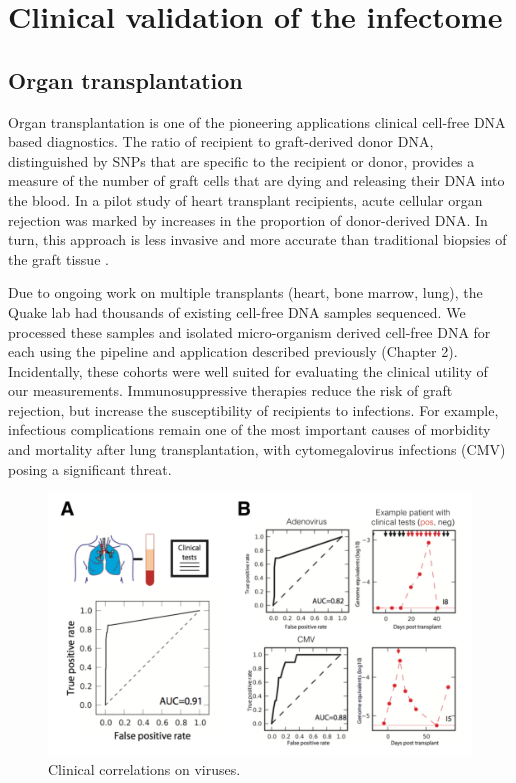 \chapter{Clinical validation of the infectome}
 
\section{Organ transplantation}
 
Organ transplantation is one of the pioneering applications clinical cell-free DNA based diagnostics. The ratio of recipient to graft-derived donor DNA, distinguished by SNPs that are specific to the recipient or donor, provides a measure of the number of graft cells that are dying and releasing their DNA into the blood. In a pilot study of heart transplant recipients, acute cellular organ rejection was marked by increases in the proportion of donor-derived DNA. In turn, this approach is less invasive and more accurate than traditional biopsies of the graft tissue \cite{Snyder:2011gd}.

Due to ongoing work on multiple transplants (heart, bone marrow, lung), the Quake lab had thousands of existing cell-free DNA samples sequenced. We processed these samples and isolated micro-organism derived cell-free DNA for each using the pipeline and application described previously (Chapter 2). Incidentally, these cohorts were well suited for evaluating the clinical utility of our measurements. Immunosuppressive therapies reduce the risk of graft rejection, but increase the susceptibility of recipients to infections. For example, infectious complications remain one of the most important causes of morbidity and mortality after lung transplantation, with cytomegalovirus infections (CMV) posing a significant threat. 

\begin{figure}
\center\includegraphics[width=150mm,scale=0.5]{Figures/Fig9}
\caption{Clinical correlations on viruses.}
\label{fig:Fig9}
\end{figure}

